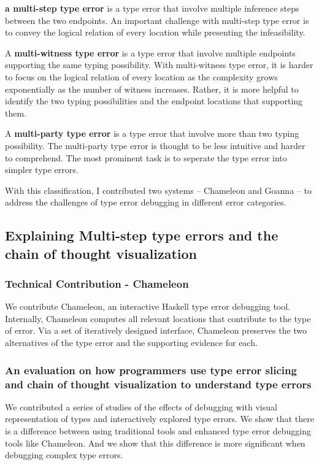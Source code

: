 \textbf{a multi-step type error} is a type error that involve multiple inference steps between the two endpoints. An important challenge with multi-step type error is to convey the logical relation of every location while presenting the infeasibility. 

A \textbf{multi-witness type error} is a type error that involve multiple endpoints supporting the same typing possibility. With multi-witness type error, it is harder to focus on the logical relation of every location as the complexity grows exponentially as the number of witness increases. Rather, it is more helpful to identify the two typing possibilities and the endpoint locations that supporting them.

A \textbf{multi-party type error} is a type error that involve more than two typing possibility. The multi-party type error is thought to be less intuitive and harder to comprehend. The most prominent task is to seperate the type error into simpler type errors. 


With this classification, I contributed two systems -- Chameleon and Goanna -- to address the challenges of type error debugging in different error categories.

\subsection{Explaining Multi-step type errors and the chain of thought visualization}

\subsubsection{Technical Contribution - Chameleon}
We contribute Chameleon, an interactive Haskell type error debugging tool. Internally, Chameleon computes all relevant locations that contribute to the type of error. Via a set of iteratively designed interface, Chameleon preserves the two alternatives of the type error and the supporting evidence for each.

\subsubsection{An evaluation on how programmers use type error slicing and chain of thought visualization to understand type errors}
We  contributed a series of studies of the effects of debugging with visual representation of types and interactively explored type errors. We show that there is a difference between using traditional tools and enhanced type error debugging tools like Chameleon. And we show that this difference is more significant when debugging complex type errors.

